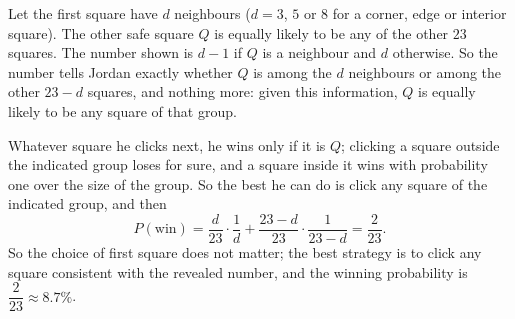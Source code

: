 Let the first square have $d$ neighbours ($d=3$, $5$ or $8$ for a corner, edge or interior square). The other safe square $Q$ is equally likely to be any of the other $23$ squares. The number shown is $d-1$ if $Q$ is a neighbour and $d$ otherwise. So the number tells Jordan exactly whether $Q$ is among the $d$ neighbours or among the other $23-d$ squares, and nothing more: given this information, $Q$ is equally likely to be any square of that group.

Whatever square he clicks next, he wins only if it is $Q$; clicking a square outside the indicated group loses for sure, and a square inside it wins with probability one over the size of the group. So the best he can do is click any square of the indicated group, and then
\[P(\text{win})=\dfrac d{23}\cdot\dfrac1d+\dfrac{23-d}{23}\cdot\dfrac1{23-d}=\dfrac2{23}.\]
So the choice of first square does not matter; the best strategy is to click any square consistent with the revealed number, and the winning probability is $\boxed{\dfrac2{23}}\approx8.7\%$.
